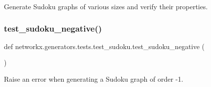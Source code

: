 \begin{DoxyVerb}Generate Sudoku graphs of various sizes and verify their properties.\end{DoxyVerb}
 \mbox{\label{namespacenetworkx_1_1generators_1_1tests_1_1test__sudoku_a82d6b056c8b9f894ae9263c5a8a8b66b}} 
\subsubsection{\texorpdfstring{test\+\_\+sudoku\+\_\+negative()}{test\_sudoku\_negative()}}
{\footnotesize\ttfamily def networkx.\+generators.\+tests.\+test\+\_\+sudoku.\+test\+\_\+sudoku\+\_\+negative (\begin{DoxyParamCaption}{ }\end{DoxyParamCaption})}

\begin{DoxyVerb}Raise an error when generating a Sudoku graph of order -1.\end{DoxyVerb}
 